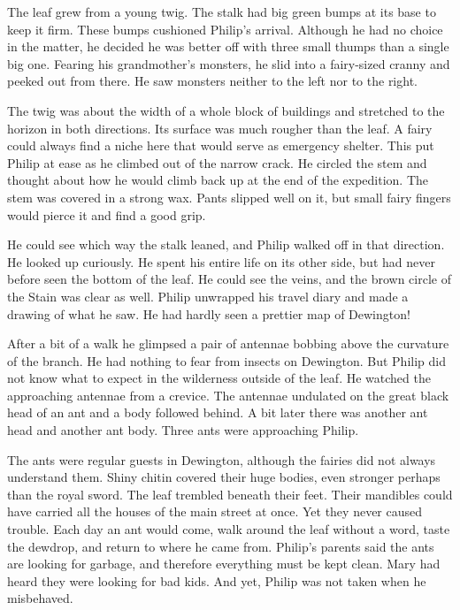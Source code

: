 \documentclass[10pt, draft]{memoir}
\begin{document}
The leaf grew from a young twig. The stalk had big green bumps at its base to
keep it firm. These bumps cushioned Philip's arrival. Although he had no choice
in the matter, he decided he was better off with three small thumps than a
single big one. Fearing his grandmother's monsters, he slid into a fairy-sized
cranny and peeked out from there. He saw monsters neither to the left nor to
the right.

The twig was about the width of a whole block of buildings and stretched to the
horizon in both directions. Its surface was much rougher than the leaf. A fairy
could always find a niche here that would serve as emergency shelter. This put
Philip at ease as he climbed out of the narrow crack. He circled the stem and
thought about how he would climb back up at the end of the expedition. The stem
was covered in a strong wax. Pants slipped well on it, but small fairy fingers
would pierce it and find a good grip.

He could see which way the stalk leaned, and Philip walked off in that
direction. He looked up curiously. He spent his entire life on its other side,
but had never before seen the bottom of the leaf. He could see the veins, and
the brown circle of the Stain was clear as well. Philip unwrapped his travel
diary and made a drawing of what he saw. He had hardly seen a prettier map of
Dewington!

After a bit of a walk he glimpsed a pair of antennae bobbing above the
curvature of the branch. He had nothing to fear from insects on Dewington. But
Philip did not know what to expect in the wilderness outside of the leaf. He
watched the approaching antennae from a crevice. The antennae undulated on the
great black head of an ant and a body followed behind. A bit later there was
another ant head and another ant body. Three ants were approaching Philip.

The ants were regular guests in Dewington, although the fairies did not always
understand them. Shiny chitin covered their huge bodies, even stronger perhaps
than the royal sword. The leaf trembled beneath their feet. Their mandibles
could have carried all the houses of the main street at once. Yet they never
caused trouble. Each day an ant would come, walk around the leaf without a
word, taste the dewdrop, and return to where he came from. Philip's parents
said the ants are looking for garbage, and therefore everything must be kept
clean. Mary had heard they were looking for bad kids. And yet, Philip was not
taken when he misbehaved.
\end{document}
